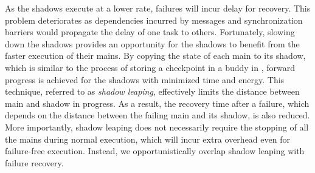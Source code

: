 As the shadows execute at a lower rate, failures will incur delay for recovery. This problem deteriorates as dependencies incurred by messages and synchronization barriers would propagate the delay of one task to others.  
Fortunately, slowing down the shadows provides an opportunity for the shadows to benefit from the faster execution of their mains. By copying the state of each main to its shadow, which is similar to the process of storing a checkpoint in a buddy in \cite{zheng_2004_ftccharm}, forward progress is achieved for the shadows with minimized time and energy. This technique, referred to as \textit{shadow leaping}, effectively limits the distance between main and shadow in progress. 
As a result, the recovery time after a failure, which depends on the distance between the failing main 
and its shadow, is also reduced. 
More importantly, shadow leaping does not necessarily require the stopping of all the mains during normal execution, which will incur extra overhead even for failure-free execution. 
Instead, we opportunistically overlap shadow leaping with failure recovery. 

